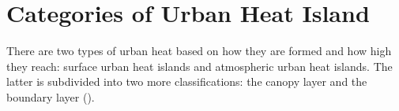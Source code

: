 \section{Categories of Urban Heat Island}

There are two types of urban heat based on how they are formed and how high they reach:
surface urban heat islands and atmospheric urban heat islands.
The latter is subdivided into two more classifications:
the canopy layer and the boundary layer (\cite{Zhou2018}).